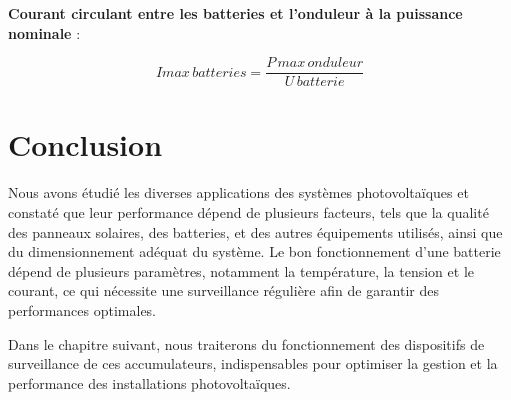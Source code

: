 \textbf{Courant circulant entre les batteries et l’onduleur à la puissance nominale} :

\begin{equation}
Imax \, batteries = \frac{P \, max \, onduleur}{U \, batterie}
\end{equation}

\section{Conclusion}
Nous avons étudié les diverses applications des systèmes photovoltaïques et constaté que leur performance dépend de plusieurs facteurs, tels que la qualité des panneaux solaires, des batteries, et des autres équipements utilisés, ainsi que du dimensionnement adéquat du système. Le bon fonctionnement d'une batterie dépend de plusieurs paramètres, notamment la température, la tension et le courant, ce qui nécessite une surveillance régulière afin de garantir des performances optimales.

Dans le chapitre suivant, nous traiterons du fonctionnement des dispositifs de surveillance de ces accumulateurs, indispensables pour optimiser la gestion et la performance des installations photovoltaïques.







